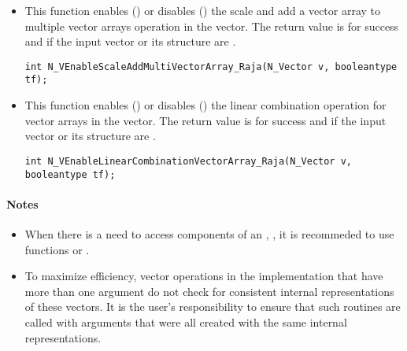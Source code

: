 \begin{itemize}


\item {}

This function enables () or disables () the scale and
add a vector array to multiple vector arrays operation in the {\raja} vector. The
return value is  for success and  if the input vector or its
 structure are .

\verb|int N_VEnableScaleAddMultiVectorArray_Raja(N_Vector v, booleantype tf);|


\item {}

This function enables () or disables () the linear
combination operation for vector arrays in the {\raja} vector. The return value
is  for success and  if the input vector or its  structure
are .

\verb|int N_VEnableLinearCombinationVectorArray_Raja(N_Vector v, booleantype tf);|

\end{itemize}
\paragraph{\bf Notes}

\begin{itemize}

\item
  When there is a need to access components of an , ,
  it is recommeded to use functions  or
  .


\item
  {\warn}To maximize efficiency, vector operations in the {\nvecraja} implementation
  that have more than one  argument do not check for
  consistent internal representations of these vectors. It is the user's
  responsibility to ensure that such routines are called with 
  arguments that were all created with the same internal representations.

\end{itemize}

